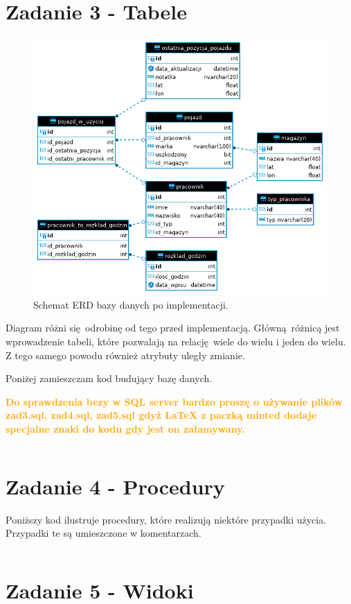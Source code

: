 \documentclass{article}
\begin{document}
\section{Zadanie 3 - Tabele}

\begin{figure}[H]
    \centering
    \includegraphics[width=\textwidth]{assets/chart-after-implementation.png}
    \caption{Schemat ERD bazy danych po implementacji.}
\end{figure}

Diagram różni się odrobinę od tego przed implementacją. Główną różnicą jest
wprowadzenie tabeli, które pozwalają na relację wiele do wielu i jeden do wielu.
Z tego samego powodu również atrybuty uległy zmianie.

Poniżej zamieszczam kod budujący bazę danych. 

\textbf{\textcolor{orange}{Do sprawdzenia bezy w SQL server bardzo proszę 
o używanie plików zad3.sql, zad4.sql, zad5.sql gdyż LaTeX z paczką minted
dodaje specjalne znaki do kodu gdy jest on załamywany.}}

\inputminted[breaklines]{sql}{../zad3.sql}

\section{Zadanie 4 - Procedury}

Poniższy kod ilustruje procedury, które realizują niektóre przypadki użycia.
Przypadki te są umieszczone w komentarzach.

\inputminted[breaklines]{sql}{../zad4.sql}

\section{Zadanie 5 - Widoki}
\inputminted[breaklines]{sql}{../zad5.sql}
\end{document}
